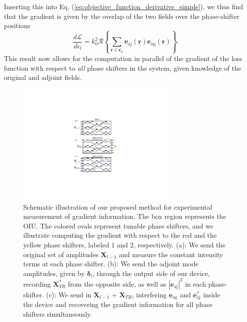 Inserting this into Eq. (\ref{eq:objective_function_derivative_simple}), we thus find that the gradient is given by the overlap of the two fields over the phase-shifter positions
%
\begin{equation}
\frac{d\mathcal{L}}{d\epsilon_l} = k_0^2 \mathcal{R}\left\{ \sum_{\mathbf{r} \in \mathbf{r}_\phi} \mathbf{e}_{\textrm{aj}}(\mathbf{r}) \mathbf{e}_{\textrm{og}}(\mathbf{r}) \right\}.
\label{eq:sensitivity_sum}
\end{equation}
%
This result now allows for the computation in parallel of the gradient of the loss function with respect to \textit{all} phase shifters in the system, given knowledge of the original and adjoint fields.

\begin{figure}[ht!]
\centering
\includegraphics[width=0.7\textwidth]{figures/insitu_TR}
\caption{\label{fig:TR_schematic} Schematic illustration of our proposed method for experimental measurement of gradient information. The box region represents the OIU.  The colored ovals represent tunable phase shifters, and we illustrate computing the gradient with respect to the red and the yellow phase shifters, labeled $1$ and $2$, respectively. (a): We send the original set of amplitudes $\mathbf{X}_{l-1}$ and measure the constant intensity terms at each phase shifter. (b): We send the adjoint mode amplitudes, given by $\boldsymbol{\delta}_l$, through the output side of our device, recording $\mathbf{X}_{TR}^*$ from the opposite side, as well as $|\mathbf{e}_\textrm{aj}|^2$ in each phase-shifter. (c): We send in $\mathbf{X}_{l-1}$ + $\mathbf{X}_{TR}$, interfering $\mathbf{e}_{\textrm{og}}$ and $\mathbf{e}_\textrm{aj}^*$ inside the device and recovering the gradient information for all phase shifters simultaneously.}
\end{figure}

